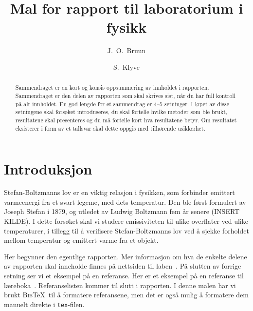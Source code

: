 \begin{frontmatter}

\title{Mal for rapport til laboratorium i fysikk}

\author{J.~O.~Bruun}
\author{S.~Klyve}

\begin{abstract}
Sammendraget er en kort og konsis oppsummering av innholdet i rapporten. Sammendraget er den delen av rapporten som skal skrives sist, når du har full kontroll på alt innholdet. En god lengde for et sammendrag er 4--5 setninger. I løpet av disse setningene skal forsøket introduseres, du skal fortelle hvilke metoder som ble brukt, resultatene skal presenteres og du må fortelle kort hva resultatene betyr. Om resultatet eksisterer i form av et tallsvar skal dette oppgis med tilhørende usikkerhet. 
\end{abstract}

\end{frontmatter}


\section{Introduksjon}
Stefan-Boltzmanns lov er en viktig relasjon i fysikken, som forbinder emittert varmeenergi  fra et svart legeme, med dets temperatur. Den ble først formulert av Joseph Stefan i 1879, og utledet av Ludwig Boltzmann fem år senere (INSERT KILDE). I dette forsøket skal vi studere emissiviteten til ulike overflater ved ulike temperaturer, i tillegg til å verifisere Stefan-Boltzmanns lov ved å sjekke forholdet mellom temperatur og emittert varme fra et objekt.


Her begynner den egentlige rapporten. Mer informasjon om hva de enkelte delene av rapporten skal inneholde finnes på nettsiden til laben~\cite{labside}. På slutten av forrige setning ser vi et eksempel på en referanse. Her er et eksempel på en referanse til læreboka~\cite{Young2016}. Referanselisten kommer til slutt i rapporten. I denne malen har vi brukt \textsc{Bib}\TeX\ til å formatere referansene, men det er også mulig å formatere dem manuelt direkte i \texttt{tex}-filen. 



